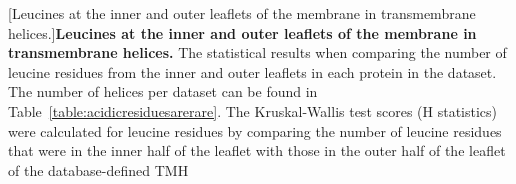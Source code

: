 \begin{table}[htbp]

  \centering
  [Leucines at the inner and outer leaflets of the membrane in  transmembrane helices.]{\textbf{Leucines at the inner and outer leaflets of the membrane in  transmembrane helices.}
  The statistical results when comparing the number of leucine residues from the inner and outer leaflets in each protein in the dataset.
  The number of helices per dataset can be found in Table~\ref{table:acidicresiduesarerare}.
  The Kruskal-Wallis test scores (H statistics) were calculated for leucine residues by comparing the number of leucine residues that were in the inner half of the leaflet with those in the outer half of the leaflet of the database-defined TMH}


\end{table}
